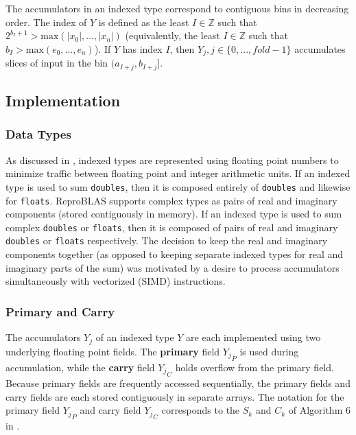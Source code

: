 \documentclass[12pt]{article}
\providecommand{\Z}{\ensuremath{\mathbb{Z}}}
\providecommand{\max}{\ensuremath{\text{max}}}
\theoremstyle{plain}
\begin{document}
    The accumulators in an indexed type correspond to contiguous bins in decreasing order. The index of $Y$ is defined as the least $I \in \Z$ such that $2^{b_I + 1} > \max(|x_0|, ..., |x_n|)$ (equivalently, the least $I \in \Z$ such that $b_I > \max(e_0, ..., e_n)$). If $Y$ has index $I$, then $Y_j, j \in \{0, ..., fold - 1\}$ accumulates slices of input in the bin $(a_{I + j}, b_{I + j}]$.

  \subsection{Implementation}
    \subsubsection{Data Types}
      As discussed in \cite{repsum}, indexed types are represented using floating point numbers to minimize traffic between floating point and integer arithmetic units. If an indexed type is used to sum \verb|doubles|, then it is composed entirely of \verb|doubles| and likewise for \verb|floats|. ReproBLAS supports complex types as pairs of real and imaginary components (stored contiguously in memory). If an indexed type is used to sum complex \verb|doubles| or \verb|floats|, then it is composed of pairs of real and imaginary \verb|doubles| or \verb|floats| respectively. The decision to keep the real and imaginary components together (as opposed to keeping separate indexed types for real and imaginary parts of the sum) was motivated by a desire to process accumulators simultaneously with vectorized (SIMD) instructions.

    \subsubsection{Primary and Carry}
      The accumulators $Y_j$ of an indexed type $Y$ are each implemented using two underlying floating point fields. The \textbf{primary} field ${Y_j}_P$ is used during accumulation, while the \textbf{carry} field ${Y_j}_C$ holds overflow from the primary field. Because primary fields are frequently accessed sequentially, the primary fields and carry fields are each stored contiguously in separate arrays. The notation for the primary field ${Y_j}_P$ and carry field ${Y_j}_C$ corresponds to the $S_k$ and $C_k$ of Algorithm $6$ in \cite{repsum}.
\end{document}
